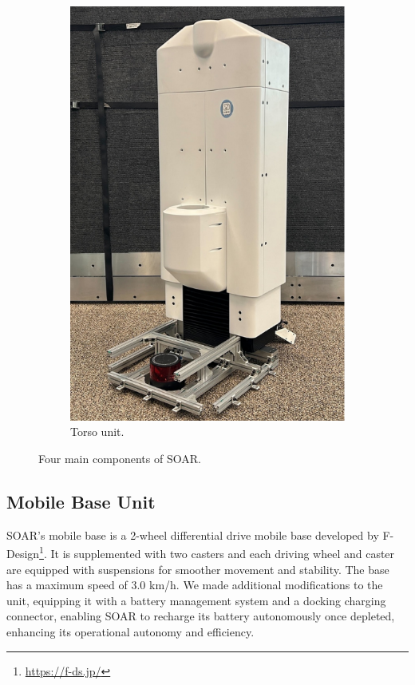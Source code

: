 \documentclass[runningheads,a4paper]{llncs}
\begin{document}
\begin{figure}[tbp]
\begin{subfigure}[t]{0.24\linewidth}
		\includegraphics[width=\linewidth]{images/component_torso.png}
		\caption{Torso unit.}
	\end{subfigure}
	\caption{Four main components of SOAR.}
	\label{fig:components}
\end{figure}

\subsection{Mobile Base Unit}
SOAR’s mobile base is a 2-wheel differential drive mobile base developed by F-Design\footnote{\url{https://f-ds.jp/}}.
It is supplemented with two casters and each driving wheel and caster are equipped with suspensions for smoother movement and stability.
The base has a maximum speed of 3.0 km/h.
We made additional modifications to the unit, equipping it with a battery management system and a docking charging connector, enabling SOAR to recharge its battery autonomously once depleted, enhancing its operational autonomy and efficiency.
\end{document}
